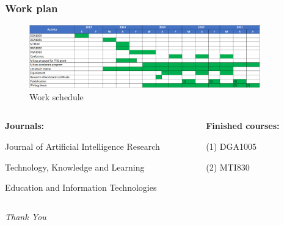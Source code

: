 \documentclass{beamer}
\begin{document}
\begin{frame}
\frametitle{Work plan}
\begin{figure}
	\includegraphics[width=100mm]{plan0.png}
	\caption{Work schedule}
\end{figure}

\begin{columns}[T]
	\begin{column}{.7\textwidth}
	\textbf{Journals:}
	\par [1] Journal of Artificial Intelligence Research 
	\par [2] Technology, Knowledge and Learning
	\par [3] Education and Information Technologies
		
	\end{column}
	\begin{column}{.3\textwidth}
	\textbf{Finished courses:}
	\par (1) DGA1005
	\par (2) MTI830

	\end{column}
\end{columns}



\end{frame}




\begin{frame}{}
\centering \Huge
\emph{Thank You}
\end{frame}
\end{document}
